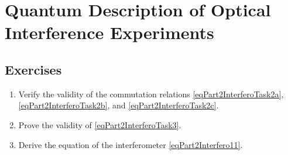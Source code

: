 \chapter{Quantum Description of Optical Interference Experiments}
\label{chInterfero}





\section{Exercises}
\begin{enumerate}
\item Verify the validity of the commutation relations \eqref{eqPart2InterferoTask2a}, \eqref{eqPart2InterferoTask2b}, and \eqref{eqPart2InterferoTask2c}. 
\item Prove the validity of \eqref{eqPart2InterferoTask3}.
\item Derive the equation of the interferometer \eqref{eqPart2Interfero11}.
\end{enumerate}

